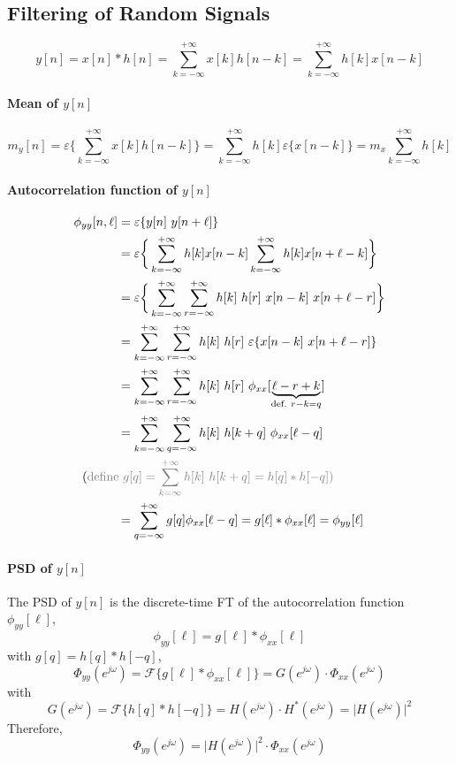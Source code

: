 \subsection{Filtering of Random Signals}
\[
    y[n] = x[n] * h[n] = \sum_{k=-\infty}^{+\infty} x[k] h[n-k] = \sum_{k=-\infty}^{+\infty} h[k]x[n-k]
\]
\paragraph{Mean of $y[n]$}
\[
    m_y[n] = \varepsilon\bigg\{ \sum_{k=-\infty}^{+\infty} x[k] h[n-k] \bigg\} = \sum_{k=-\infty}^{+\infty} h[k] \varepsilon\{x[n-k]\} = m_x \sum_{k=-\infty}^{+\infty} h[k]
\]
\paragraph{Autocorrelation function of $y[n]$}
\begin{align*}
    \phi_{yy}[n,\ell] 
    & = \varepsilon \{ y[n] \ y[n+\ell] \} \\
    & = \varepsilon \bigg\{ \sum_{k=-\infty}^{+\infty} h[k]x[n-k] \sum_{k=-\infty}^{+\infty} h[k] x[n+\ell-k] \bigg\} \\
    & = \varepsilon \bigg\{ \sum_{k=-\infty}^{+\infty} \sum_{r=-\infty}^{+\infty} h[k] \ h[r] \ x[n-k] \ x[n+\ell-r] \bigg\} \\
    & = \sum_{k=-\infty}^{+\infty} \sum_{r=-\infty}^{+\infty} h[k] \ h[r] \ \varepsilon \{ x[n-k] \ x[n+\ell-r] \} \\
    & = \sum_{k=-\infty}^{+\infty} \sum_{r=-\infty}^{+\infty} h[k] \ h[r] \ \phi_{xx}[\underbrace{\ell-r+k}_{\text{def.} \ r-k = q}] \\
    & = \sum_{k=-\infty}^{+\infty} \sum_{q=-\infty}^{+\infty} h[k] \ h[k+q] \ \phi_{xx}[\ell-q] \\
    & \hspace{-1cm} (\color{gray}\text{define} \ g[q] = \sum_{k=\infty}^{+\infty}h[k] \ h[k+q] = h[q] * h[-q]) \\
    & = \sum_{q=-\infty}^{+\infty} g[q] \phi_{xx}[\ell-q] = g[\ell]*\phi_{xx}[\ell] = \phi_{yy}[\ell]
\end{align*}

\paragraph{PSD of $y[n]$}
The PSD of $y[n]$ is the discrete-time FT of the autocorrelation function $\phi_{yy}[\ell]$,
\[
    \phi_{yy}[\ell] = g[\ell] * \phi_{xx}[\ell]
\]
with $g[q] = h[q] * h[-q]$,
\[  
    \Phi_{yy}(e^{j\omega}) = \mathcal{F} \{ g[\ell] * \phi_{xx}[\ell] \} = G(e^{j\omega}) \cdot \Phi_{xx} (e^{j\omega})
\]
with 
\[
    G(e^{j\omega}) = \mathcal{F} \{ h[q] *h[-q] \} = H(e^{j\omega}) \cdot H^{*}(e^{j\omega}) = \lvert H(e^{j\omega}) \rvert^2
\]
Therefore, 
\[
    \Phi_{yy}(e^{j\omega}) = \lvert H(e^{j\omega}) \rvert^2 \cdot \Phi_{xx}(e^{j\omega})
\]


